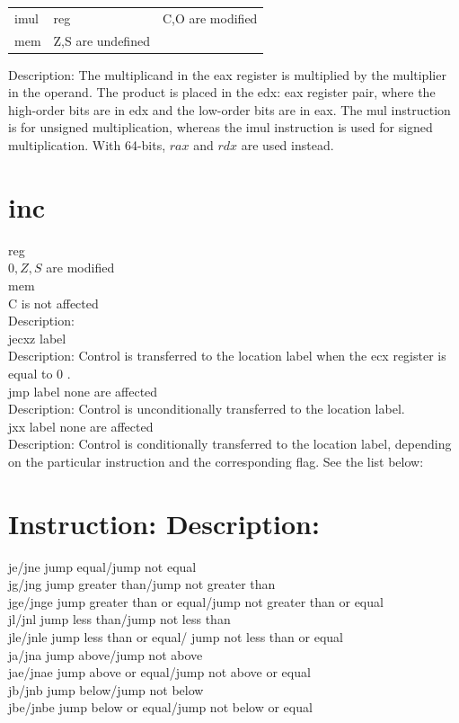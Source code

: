 \documentclass[10pt]{book}
\begin{document}
\begin{center}
\begin{tabular}{lll}
imul & reg & C,O are modified \\
mem & Z,S are undefined &  \\
\end{tabular}
\end{center}

Description: The multiplicand in the eax register is multiplied by the multiplier in the operand. The product is placed in the edx: eax register pair, where the high-order bits are in edx and the low-order bits are in eax. The mul instruction is for unsigned multiplication, whereas the imul instruction is used for signed multiplication. With 64-bits, $r a x$ and $r d x$ are used instead.

\section{inc}
reg\\
$0, Z, S$ are modified\\
mem\\
C is not affected\\
Description:\\
jecxz label\\
Description: Control is transferred to the location label when the ecx register is equal to 0 .\\
jmp label none are affected\\
Description: Control is unconditionally transferred to the location label.\\
jxx label none are affected\\
Description: Control is conditionally transferred to the location label, depending on the particular instruction and the corresponding flag. See the list below:

\section{Instruction: Description:}
je/jne jump equal/jump not equal\\
jg/jng jump greater than/jump not greater than\\
jge/jnge jump greater than or equal/jump not greater than or equal\\
jl/jnl jump less than/jump not less than\\
jle/jnle jump less than or equal/ jump not less than or equal\\
ja/jna jump above/jump not above\\
jae/jnae jump above or equal/jump not above or equal\\
jb/jnb jump below/jump not below\\
jbe/jnbe jump below or equal/jump not below or equal
\end{document}

